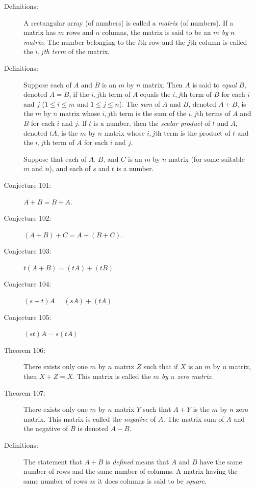 \documentclass{article}
\begin{document}
\begin{description}

  \item[Definitions:] A rectangular array (of numbers) is called a \emph{matrix} (of numbers). If a matrix has $m$ rows and $n$ columns, the matrix is said to be an \emph{$m$ by $n$ matrix}. The number belonging to the $i$th row and the $j$th column is called the \emph{$i,j$th term} of the matrix.

  \item[Definitions:] Suppose each of $A$ and $B$ is an $m$ by $n$ matrix. Then $A$ is said to \emph{equal} $B$, denoted $A = B$, if the $i,j$th term of $A$ equals the $i,j$th term of $B$ for each $i$ and $j$ ($1 \leq i \leq m$ and $1 \leq j \leq n$). The \emph{sum} of $A$ and $B$, denoted $A + B$, is the $m$ by $n$ matrix whose $i,j$th term is the sum of the $i,j$th terms of $A$ and $B$ for each $i$ and $j$. If $t$ is a number, then the \emph{scalar product} of $t$ and $A$, denoted $tA$, is the $m$ by $n$ matrix whose $i,j$th term is the product of $t$ and the $i,j$th term of $A$ for each $i$ and $j$.

  \item[] Suppose that each of $A$, $B$, and $C$ is an $m$ by $n$ matrix (for some suitable $m$ and $n$), and each of $s$ and $t$ is a number.

  \item[Conjecture 101:] $A + B = B + A$.

  \item[Conjecture 102:] $(A + B) + C = A + (B + C)$.

  \item[Conjecture 103:] $t(A + B) = (tA) + (tB)$

  \item[Conjecture 104:] $(s+t)A = (sA) + (tA)$

  \item[Conjecture 105:] $(st)A = s(tA)$

  \item[Theorem 106:] There exists only one $m$ by $n$ matrix $Z$ such that if $X$ is an $m$ by $n$ matrix, then $X + Z = X$. This matrix is called the \emph{$m$ by $n$ zero matrix}.

  \item[Theorem 107:] There exists only one $m$ by $n$ matrix $Y$ such that $A + Y$ is the $m$ by $n$ zero matrix. This matrix is called the \emph{negative} of $A$. The matrix sum of $A$ and the negative of $B$ is denoted $A-B$.

  \item[Definitions:] The statement that $A+B$ is \emph{defined} means that $A$ and $B$ have the same number of rows and the same number of columns. A matrix having the same number of rows as it does columns is said to be \emph{square}.

\end{description}
\end{document}
